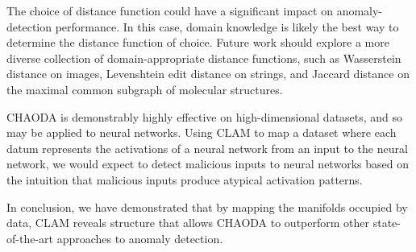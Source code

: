 



The choice of distance function could have a significant impact on anomaly-detection performance.
In this case, domain knowledge is likely the best way to determine the distance function of choice.
Future work should explore a more diverse collection of domain-appropriate distance functions, such as Wasserstein distance on images, Levenshtein edit distance on strings, and Jaccard distance on the maximal common subgraph of molecular structures.

CHAODA is demonstrably highly effective on high-dimensional datasets, and so may be applied to neural networks.
Using CLAM to map a dataset where each datum represents the activations of a neural network from an input to the neural network, we would expect to detect malicious inputs to neural networks based on the intuition that malicious inputs produce atypical activation patterns.

In conclusion, we have demonstrated that by mapping the manifolds occupied by data, CLAM reveals structure that allows CHAODA to outperform other state-of-the-art approaches to anomaly detection.

